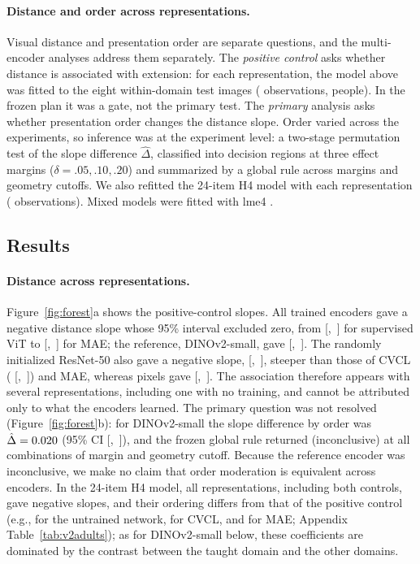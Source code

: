 \documentclass[11pt]{article}
\begin{document}
\paragraph{Distance and order across representations.} Visual distance and presentation order are separate questions, and the multi-encoder analyses address them separately. The \emph{positive control} asks whether distance is associated with extension: for each representation, the model above was fitted to the eight within-domain test images (\VtPcNobs{} observations, \VtPersons{} people). In the frozen plan it was a gate, not the primary test. The \emph{primary} analysis asks whether presentation order changes the distance slope. Order varied across the \VtNexp{} experiments, so inference was at the experiment level: a two-stage permutation test of the slope difference $\hat\Delta$, classified into decision regions at three effect margins ($\delta = .05, .10, .20$) and summarized by a global rule across margins and geometry cutoffs. We also refitted the 24-item H4 model with each representation (\VtHfourNobs{} observations). Mixed models were fitted with lme4 \parencite{bates2015}.

\subsection{Results}

\paragraph{Distance across representations.} Figure~\ref{fig:forest}a shows the positive-control slopes. All \VtPcTrainedNeg{} trained encoders gave a negative distance slope whose 95\% interval excluded zero, from \VtPcViTB{} [\VtPcViTLo,~\VtPcViTHi] for supervised ViT to \VtPcMaeB{} [\VtPcMaeLo,~\VtPcMaeHi] for MAE; the reference, DINOv2-small, gave \VtPcRefB{} [\VtPcRefLo,~\VtPcRefHi]. The randomly initialized ResNet-50 also gave a negative slope, \VtPcRandB{} [\VtPcRandLo,~\VtPcRandHi], steeper than those of CVCL (\VbPcCvclB{} [\VbPcCvclLo,~\VbPcCvclHi]) and MAE, whereas pixels gave \VtPcPixB{} [\VtPcPixLo,~\VtPcPixHi]. The association therefore appears with several representations, including one with no training, and cannot be attributed only to what the encoders learned. The primary question was not resolved (Figure~\ref{fig:forest}b): for DINOv2-small the slope difference by order was $\hat\Delta = 0.020$ (95\% CI [\VtOrdLo,~\VtOrdHi]), and the frozen global rule returned \VtGlobalLabel{} (inconclusive) at all \VtGlobalCells{} combinations of margin and geometry cutoff. Because the reference encoder was inconclusive, we make no claim that order moderation is equivalent across encoders. In the 24-item H4 model, all \VbHfourAllNeg{} representations, including both controls, gave negative slopes, and their ordering differs from that of the positive control (e.g., \VbHfourRandB{} for the untrained network, \VbHfourCvclB{} for CVCL, and \VbHfourMaeB{} for MAE; Appendix Table~\ref{tab:v2adults}); as for DINOv2-small below, these coefficients are dominated by the contrast between the taught domain and the other domains.
\end{document}
